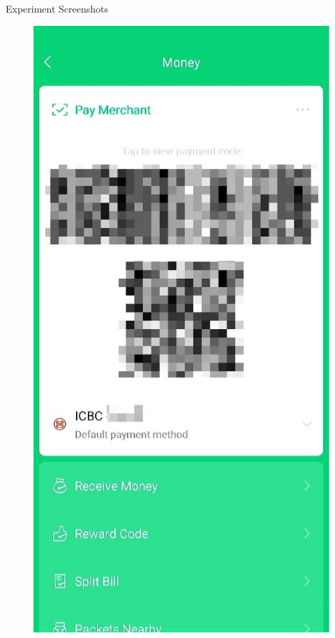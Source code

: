 \documentclass{beamer}
\begin{document}
\begin{frame}{Experiment Screenshots}
\begin{figure}[htbp]
\begin{minipage}[t]{0.3\textwidth}
		\end{minipage}
		\begin{minipage}[t]{0.3\textwidth}
			\centering
			\includegraphics[width=\textwidth]{Figs/wechat.png}

\end{minipage}
\end{figure}
\end{frame}
\end{document}
